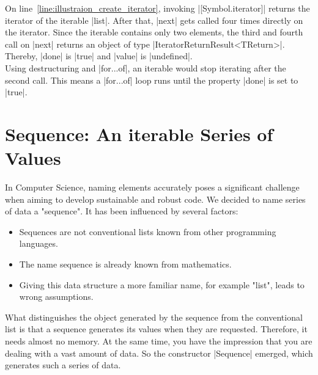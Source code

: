 On line~\ref{line:illustraion_create_iterator}, invoking |[Symbol.iterator]|
returns the iterator of the iterable |list|. 
After that, |next| gets called four times directly on the iterator. Since the
iterable contains only two elements, the third and fourth call on |next|
returns an object of type |IteratorReturnResult<TReturn>|. Thereby, |done| is
|true| and |value| is |undefined|. \\
Using destructuring and |for...of|, an iterable would stop iterating after
the second call. This means a |for...of| loop runs until the property |done|
is set to |true|.

\section{Sequence: An iterable Series of Values}
\label{sec:Sequence: A Series of Values}
In Computer Science, naming elements accurately poses a significant challenge 
when aiming to develop sustainable and robust code. We decided to name series
of data a "sequence". It has been influenced by several factors:

\begin{itemize}
  \item Sequences are not conventional lists known from other programming
    languages.
\item The name sequence is already known from mathematics.
\item Giving this data structure a more familiar name, for example "list",
  leads to wrong assumptions. 
\end{itemize}
What distinguishes the object generated by the sequence from the conventional
list is that a sequence generates its values when they are requested.
Therefore, it needs almost no memory. At the same time, you have the impression
that you are dealing with a vast amount of data. So the constructor |Sequence|
emerged, which generates such a series of data.

